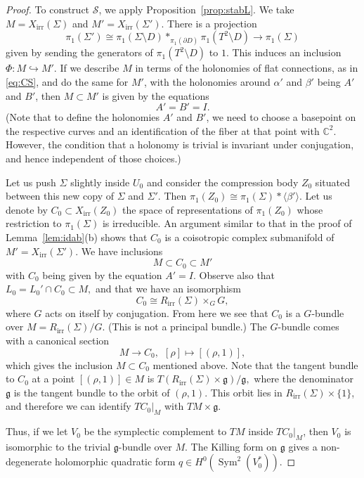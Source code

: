 \documentclass [11pt]{amsart}
\theoremstyle{remark}
\def\cc {{\mathbb{C}}}
\def\C{\cc}
\def\del{\partial}
\def\g{\mathfrak{g}}
\def\Sym{{\operatorname{Sym}}}
\def\RepIrr{R_{\operatorname{irr}}}
\def\Char {X}
\def\CharIrr {\Char_{\operatorname{irr}}}
\def\Stab{\mathscr{S}}
\begin{document}
\begin{proof}
 To construct $\Stab$, we apply Proposition~\ref{prop:stabL}. We take $M=\CharIrr(\Sigma)$ and $M' = \CharIrr(\Sigma')$. There is a projection
$$ \pi_1(\Sigma') \cong \pi_1(\Sigma \setminus D) *_{\pi_1(\del D)} \pi_1(T^2 \setminus D) \longrightarrow \pi_1(\Sigma)$$
given by sending the generators of $\pi_1(T^2 \setminus D)$ to $1$. This induces an inclusion $\Phi: M \hookrightarrow M'$. If we describe $M$ in terms of the holonomies of flat connections, as in \eqref{eq:CS}, and do the same for $M'$, with the holonomies around $\alpha'$ and $\beta'$ being $A'$ and $B'$, then $M \subset M'$ is given by the equations
$$ A' = B' = I.$$
(Note that to define the holonomies $A'$ and $B'$, we need to choose a basepoint on the respective curves and an identification of the fiber at that point with $\C^2$. However, the condition that a holonomy is trivial is invariant under conjugation, and hence independent of those choices.)

Let us push $\Sigma$ slightly inside $U_0$ and consider the compression body $Z_0$ situated between this new copy of $\Sigma$ and $\Sigma'$.  Then $\pi_1(Z_0) \cong \pi_1(\Sigma) * \langle \beta' \rangle.$ Let us denote by $C_0 \subset \CharIrr(Z_0)$ the space of representations of $\pi_1(Z_0)$ whose restriction to $\pi_1(\Sigma)$ is irreducible. An argument similar to that in the proof of Lemma~\ref{lem:idab}(b) shows that $C_0$ is a coisotropic complex submanifold of $M'=\CharIrr(\Sigma')$. We have inclusions
$$ M \subset C_0 \subset M'$$
with $C_0$ being given by the equation $A'=I$. Observe also that $L_0 = L_0' \cap C_0 \subset M,$ and that we have an isomorphism
$$ C_0 \cong \RepIrr(\Sigma) \times_G G,$$
where $G$ acts on itself by conjugation. From here we see that  $C_0$ is a $G$-bundle over $M= \RepIrr(\Sigma)/G$. (This is not a principal bundle.) The $G$-bundle comes with a canonical section 
$$ M \to C_0, \ \ [\rho] \mapsto [(\rho, 1)],$$
which gives the inclusion $M \subset C_0$ mentioned above. Note that the tangent bundle to $C_0$ at a point $[(\rho, 1)] \in M$ is $T(\RepIrr(\Sigma) \times \g)/\g,$ where the denominator $\g$ is the tangent bundle to the orbit of $(\rho, 1)$. This orbit lies in $\RepIrr(\Sigma) \times \{1\}$, and therefore 
we can identify $TC_0|_M$ with $TM \times \g$.

Thus, if we let $V_0$ be the symplectic complement to $TM$ inside $TC_0|_{M}$, then $V_0$ is isomorphic to the trivial $\g$-bundle over $M$.  The Killing form on $\g$ gives a non-degenerate holomorphic quadratic form $q \in H^0(\Sym^2(V_0^*))$.


\end{proof}
\end{document}
